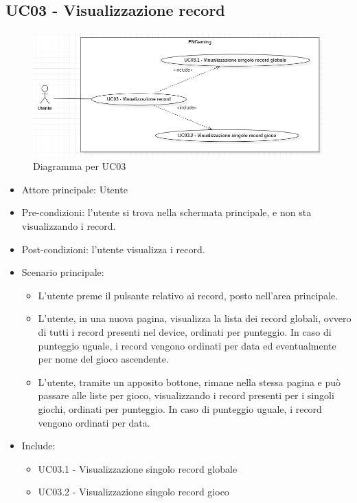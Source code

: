 \subsection{UC03 - Visualizzazione record}
\begin{figure}[h]
    \centering
    \includegraphics[width=400pt]{images/usecase/UC03.png}
    \caption{Diagramma per UC03}
    \label{fig:attore}
\end{figure}
\begin{itemize}
    \item Attore principale: Utente
    \item Pre-condizioni: l'utente si trova nella schermata principale, e non sta visualizzando i record.
    \item Post-condizioni: l'utente visualizza i record.
    \item Scenario principale: \begin{itemize}
        \item L'utente preme il pulsante relativo ai record, posto nell'area principale.
        \item L'utente, in una nuova pagina, visualizza la lista dei record globali, ovvero di tutti i record presenti nel device, ordinati per punteggio. In caso di punteggio uguale, i record vengono ordinati per data ed eventualmente per nome del gioco ascendente.
        \item L'utente, tramite un apposito bottone, rimane nella stessa pagina e può passare alle liste per gioco, visualizzando i record presenti per i singoli giochi, ordinati per punteggio. In caso di punteggio uguale, i record vengono ordinati per data.
    \end{itemize}
    \item Include: \begin{itemize}
        \item UC03.1 - Visualizzazione singolo record globale
        \item UC03.2 - Visualizzazione singolo record gioco
    \end{itemize}
\end{itemize}


